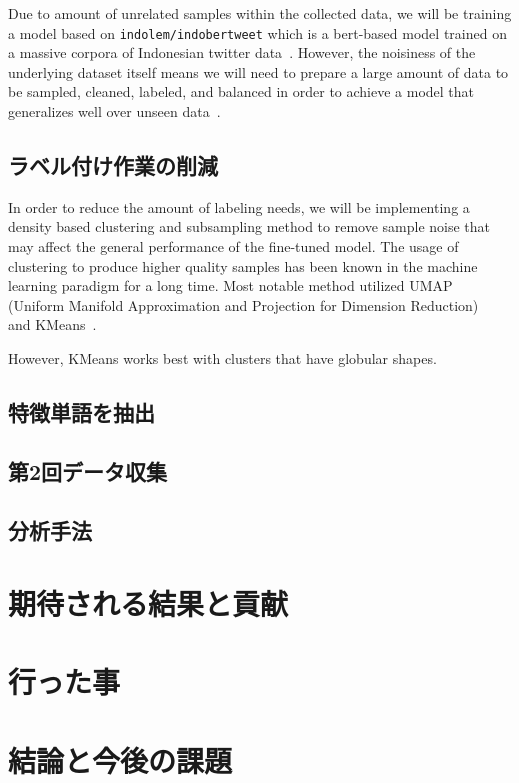 \documentclass{jabstract}
\begin{document}
\begin{multicols}{2}
Due to amount of unrelated samples within the collected data, we will be training a model based on \texttt{indolem/indobertweet} which is a bert-based model trained on a massive corpora of Indonesian twitter data~\cite{koto2021indobertweet}. However, the noisiness of the underlying dataset itself means we will need to prepare a large amount of data to be sampled, cleaned, labeled, and balanced in order to achieve a model that generalizes well over unseen data~\cite{mazumder2023dataperf}. 

\subsection{ラベル付け作業の削減}
In order to reduce the amount of labeling needs, we will be implementing a density based clustering and subsampling method to remove sample noise that may affect the general performance of the fine-tuned model. The usage of clustering to produce higher quality samples has been known in the machine learning paradigm for a long time. Most notable method utilized UMAP (Uniform Manifold Approximation and Projection for Dimension Reduction)~\cite{mcinnes2018umap} and KMeans~\cite{macqueen1967some}.

However, KMeans works best with clusters that have globular shapes. 



\subsection{特徴単語を抽出}

\subsection{第2回データ収集}
\subsection{分析手法}
\section{期待される結果と貢献}
\section{行った事}
\section{結論と今後の課題}

{\small


}



\end{multicols}
\end{document}
